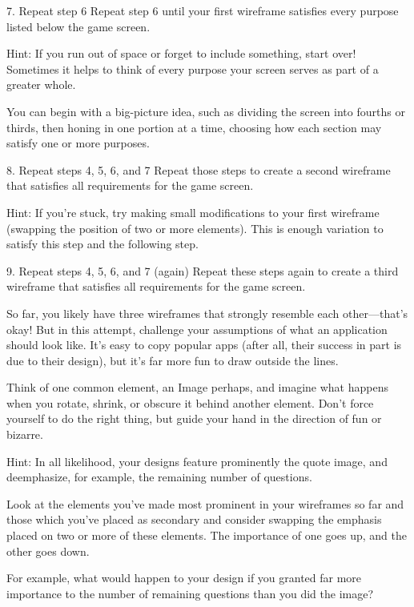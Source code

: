         7. Repeat step 6
            Repeat step 6 until your first wireframe satisfies every purpose listed below the game screen.
    
            Hint: If you run out of space or forget to include something, start over! Sometimes it helps to think of every purpose your screen serves as part of a greater whole.
            
            You can begin with a big-picture idea, such as dividing the screen into fourths or thirds, then honing in one portion at a time, choosing how each section may satisfy one or more purposes.

        8. Repeat steps 4, 5, 6, and 7
            Repeat those steps to create a second wireframe that satisfies all requirements for the game screen.

            Hint: If you’re stuck, try making small modifications to your first wireframe (swapping the position of two or more elements). This is enough variation to satisfy this step and the following step.

        9. Repeat steps 4, 5, 6, and 7 (again)
            Repeat these steps again to create a third wireframe that satisfies all requirements for the game screen.
    
            So far, you likely have three wireframes that strongly resemble each other—that’s okay! But in this attempt, challenge your assumptions of what an application should look like. It’s easy to copy popular apps (after all, their success in part is due to their design), but it’s far more fun to draw outside the lines.
    
            Think of one common element, an Image perhaps, and imagine what happens when you rotate, shrink, or obscure it behind another element. Don’t force yourself to do the right thing, but guide your hand in the direction of fun or bizarre.

            Hint: In all likelihood, your designs feature prominently the quote image, and deemphasize, for example, the remaining number of questions.
                
            Look at the elements you’ve made most prominent in your wireframes so far and those which you’ve placed as secondary and consider swapping the emphasis placed on two or more of these elements. The importance of one goes up, and the other goes down.
            
            For example, what would happen to your design if you granted far more importance to the number of remaining questions than you did the image?

